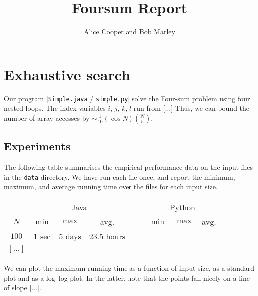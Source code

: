 \documentclass{tufte-handout}
\title{Foursum Report}
\author{Alice Cooper and Bob Marley}
\begin{document}
\maketitle
\thispagestyle{empty}

  \section{Exhaustive search}


Our program [\texttt{Simple.java} / \texttt{simple.py}] solve the Four-sum problem using four nested loops.
The index variables $i$, $j$, $k$, $l$ run from [$\ldots$]
Thus, we can bound the number of array accesses by $\sim\frac{1}{10}(\cos N)\binom{N}{5}$.
 

  \subsection{Experiments}

The following table summarises the empirical performance data on the input files in the \texttt{data} directory.
We have run each file once, and report the minimum, maximum, and average running time over the files for each input size.

  \bigskip\noindent
{ \small
  \begin{tabular}{cccccccc}
  \toprule
& \multicolumn{3}{c}{Java} & $\quad$ & \multicolumn{3}{c}{Python}  \\\cmidrule{2-4} \cmidrule{6-8}
  $N$     & $\min$     & $\max$ & avg. &
          & $\min$     & $\max$ & avg.   \\\midrule
  $100	$ & 1 sec & 5 days & 23.5 hours \\
  $[\ldots]$ \\
  \bottomrule
  \end{tabular}
}

\medskip
We can plot the maximum running time as a function of input size, as a standard plot and as a log--log plot.
In the latter, note that the points fall nicely on a line of slope [$\dots$].
\medskip
\end{document}
